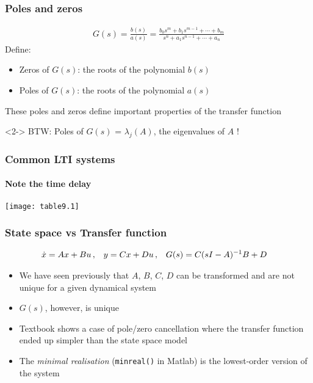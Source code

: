 \documentclass{beamer-control}
\begin{document}
\begin{frame}
\frametitle{Poles and zeros}
\begin{align}
G(s) = \frac{b(s)}{a(s)} = \frac
  { b_0 s^m  + b_1 s^{m-1}  + \cdots + b_m  }
  { s^n + a_1 s^{n-1} + \cdots + a_n  }
\end{align}
Define:
\begin{itemize}
\item Zeros of $G(s)$: the roots of the polynomial $b(s)$
\item Poles of $G(s)$: the roots of the polynomial $a(s)$
\end{itemize}
These poles and zeros define important properties of the transfer function

\bigskip
\begin{uncoverenv}<2->
BTW: Poles of $G(s)$ = $\lambda_j(A)$, the eigenvalues of $A$ !
\end{uncoverenv}
\end{frame}

\begin{frame}
\frametitle{Common LTI systems}
\framesubtitle{Note the time delay}

\texttt{[image: table9.1]}


\end{frame}



\begin{frame}
\frametitle{State space vs Transfer function}
\begin{align}
\dot x &= A x + B u \,, & 
y &= Cx + Du \,, &
G(s) &= C(sI-A)^{-1} B+D
\end{align}
\begin{itemize}
\item
We have seen previously that $A$, $B$, $C$, $D$ can be transformed and are not unique for a given dynamical system
\item
$G(s)$, however, is unique
\item
Textbook  shows a case of \alert{pole/zero cancellation} where the transfer function ended up simpler than the state space model
\item
The \emph{minimal realisation} (\texttt{minreal()} in Matlab) is the lowest-order version of the system
\end{itemize}
\end{frame}


\SUMMARYFRAME
\FINALE
\end{document}
